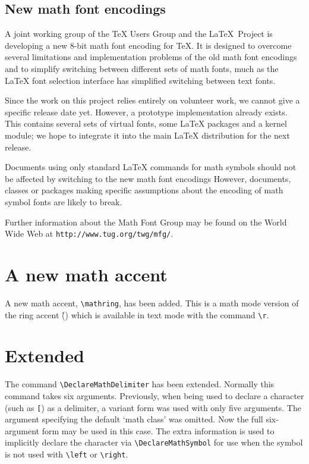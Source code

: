 \documentclass{ltnews}
\begin{document}
\maketitle


\subsection{New math font encodings}

A joint working group of the \TeX{} Users Group and the \LaTeX\
Project is developing a new 8-bit math font encoding for \TeX{}.
It is designed to overcome several limitations and implementation
problems of the old math font encodings and to simplify switching
between different sets of math fonts, much as the \LaTeX{} font
selection interface has simplified switching between text fonts.

Since the work on this project relies entirely on volunteer work, we
cannot give a specific release date yet.  However, a prototype
implementation already exists.  This contains several sets of virtual
fonts, some \LaTeX{} packages and a kernel module; we hope to
integrate it into the main \LaTeX{} distribution for the next
release.

Documents using only standard \LaTeX{} commands for math symbols
should not be affected by switching to the new math font encodings
However, documents, classes or packages making specific assumptions
about the encoding of math symbol fonts are likely to break.

Further information about the Math Font Group may be found on
the World Wide Web at \texttt{http://www.tug.org/twg/mfg/}.


\section{A new math accent}

A new math accent, \verb|\mathring|, has been added. This is a math mode
version of the ring accent (\r{}) which is available in text
mode with the command \verb|\r|.

\section{Extended }

The command \verb|\DeclareMathDelimiter| has been extended.
Normally this command takes six arguments. Previously, when being used
to declare a character (such as \texttt{[}) as a delimiter, a variant
form was used with only five arguments. The argument specifying the
default `math class' was omitted. Now the full six-argument form may be
used in this case. The extra information is used to implicitly declare
the character via \verb|\DeclareMathSymbol| for use when the symbol is
not used with \verb|\left| or \verb|\right|.
\end{document}
